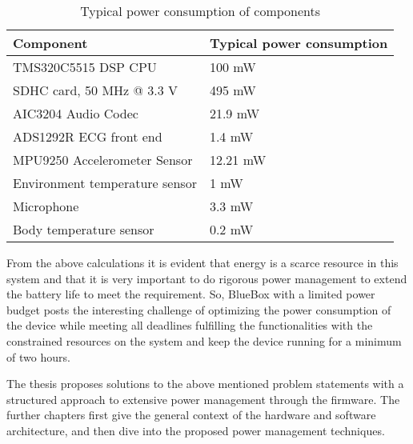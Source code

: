 \begin{table}
	\caption{Typical power consumption of components}
	\label{table:power_rating}
	\centering
	\begin{tabular}{|l|l|}
		\hline
		Component & Typical power consumption\\
		\hline
		TMS320C5515 DSP CPU &  100 mW \\
		SDHC card, 50 MHz @ 3.3 V   &  495 mW \\
		AIC3204 Audio Codec  &  21.9 mW \\	
		ADS1292R ECG front end & 1.4 mW \\
		MPU9250 Accelerometer Sensor &  12.21 mW \\
		Environment temperature sensor  &  1 mW \\
		Microphone  & 3.3 mW \\
		Body temperature sensor  &  0.2 mW \\	
		\hline
	\end{tabular}
\end{table}

From the above calculations it is evident that energy is a scarce
resource in this system and that it is very important to do rigorous
power management to extend the battery life to meet the requirement.
So, BlueBox with a limited power budget posts the interesting
challenge of optimizing the power consumption of the device while
meeting all deadlines fulfilling the functionalities with the
constrained resources on the system and keep the device running for a
minimum of two hours.

The thesis proposes solutions to the above mentioned problem
statements with a structured approach to extensive power management
through the firmware. The further chapters first give the general
context of the hardware and software architecture, and then dive into
the proposed power management techniques.

